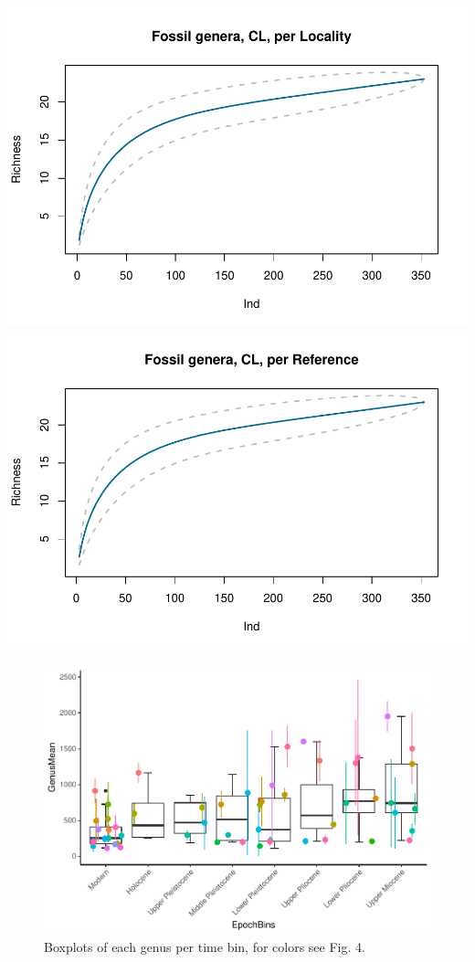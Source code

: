 \documentclass[]{article}
\begin{document}
\includegraphics{MA_JJ_files/figure-latex/Species Accumulation Curve with Genera-1.pdf}
\includegraphics{MA_JJ_files/figure-latex/Species Accumulation Curve with Genera-2.pdf}

\begin{figure}[htbp]
\centering
\includegraphics{MA_JJ_files/figure-latex/Boxplots of each genus per time bin-1.pdf}
\caption{Boxplots of each genus per time bin, for colors see Fig. 4.}
\end{figure}
\end{document}
